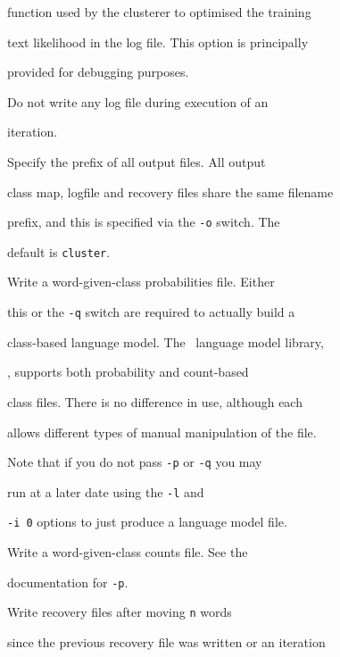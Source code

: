 \begin{optlist}
        function used by the clusterer to optimised the training


        text likelihood in the log file.  This option is principally


        provided for debugging purposes.





   Do not write any log file during execution of an


        iteration.





   Specify the prefix of all output files.  All output


        class map, logfile and recovery files share the same filename


        prefix, and this is specified via the {\tt -o} switch.  The


        default is {\tt cluster}.





   Write a word-given-class probabilities file. Either


        this or the {\tt -q} switch are required to actually build a


        class-based language model. The \HTK\ language model library,


        , supports both probability and count-based


        class files.  There is no difference in use, although each


        allows different types of manual manipulation of the file.


        Note that if you do not pass {\tt -p} or {\tt -q} you may


        run  at a later date using the {\tt -l} and


        {\tt -i 0} options to just produce a language model file.





   Write a word-given-class counts file. See the


        documentation for {\tt -p}.





   Write recovery files after moving {\tt n} words


        since the previous recovery file was written or an iteration



\end{optlist}
